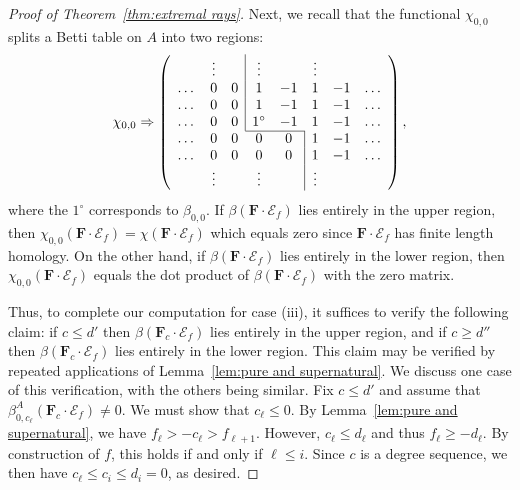 \documentclass[12pt]{amsart}
\theoremstyle{definition}
\theoremstyle{remark}
\newcommand{\cE}{\mathcal{E}}
\newcommand{\FF}{\mathbf{F}}
\begin{document}
\begin{proof}[Proof of Theorem~\ref{thm:extremal rays}]
Next, we recall that the functional $\chi_{0,0}$ splits a Betti table on $A$ into two regions:
\[
\chi_{0,0}\Rightarrow 
\left(
\begin{array}{cccccccc}
 & \vdots& &\multicolumn{1}{|c}{\vdots}&& \vdots&&\\
\dots&0&0&\multicolumn{1}{|c}{1}&-1&1&-1&\dots\\
\dots&0&0&\multicolumn{1}{|c}{1}&-1&1&-1&\dots\\
\dots&0&0&\multicolumn{1}{|c}{1^\circ}&-1&1&-1&\dots\\ \cline{4-5}
\dots&0&0&0&0&\multicolumn{1}{|c}{1}&-1&\dots\\
\dots&0&0&0&0&\multicolumn{1}{|c}{1}&-1&\dots\\
& \vdots&&\vdots&& \multicolumn{1}{|c}{\vdots}&&\\
\end{array}
\right),
\]
where the $1^\circ$ corresponds to $\beta_{0,0}$.   If $\beta(\FF\cdot \cE_f)$ lies entirely in the upper region, then $\chi_{0,0}(\FF\cdot \cE_f)=\chi(\FF\cdot \cE_f)$ which equals zero since $\FF\cdot \cE_f$ has finite length homology.  On the other hand, if $\beta(\FF\cdot \cE_f)$ lies entirely in the lower region, then $\chi_{0,0}(\FF\cdot \cE_f)$ equals the dot product of $\beta(\FF\cdot \cE_f)$ with the zero matrix.

Thus, to complete our computation for case (iii), it suffices to verify the following claim: if $c\leq d'$ then $\beta(\FF_c\cdot \cE_f)$ lies entirely in the upper region, and if $c\geq d''$ then $\beta(\FF_c\cdot \cE_f)$ lies entirely in the lower region.  This claim may be verified by repeated applications of Lemma~\ref{lem:pure and supernatural}.  We discuss one case of this verification, with the others being similar.  Fix $c\leq d'$ and assume that $\beta_{0,c_\ell}^A(\FF_c\cdot \cE_f)\ne 0$.  We must show that $c_{\ell}\leq 0$.  By Lemma~\ref{lem:pure and supernatural}, we have
$
f_{\ell}>-c_{\ell}>f_{\ell+1}.
$
However, $c_{\ell}\leq d_{\ell}$ and thus $f_{\ell}\geq -d_{\ell}$.  By construction of $f$, this holds if and only if $\ell \leq i$.  Since $c$ is a degree sequence, we then  have $c_{\ell}\leq c_i\leq d_i=0$, as desired.


\end{proof}
\end{document}
